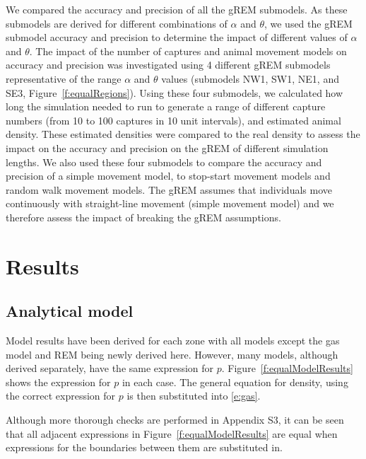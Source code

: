 \documentclass[a4paper,10pt,reqno,oneside]{amsart}
\begin{document}
We compared the accuracy and precision of all the gREM submodels. As these submodels are derived for different combinations of $\alpha$ and $\theta$, we used the gREM submodel accuracy and precision to determine the impact of different values of $\alpha$ and $\theta$. The impact of the number of captures and animal movement models on accuracy and precision was investigated using 4 different gREM submodels representative of the range $\alpha$ and $\theta$ values (submodels NW1, SW1, NE1, and SE3, Figure~\ref{f:equalRegions}). Using these four submodels, we calculated how long the simulation needed to run to generate a range of different capture numbers (from 10 to 100 captures in 10 unit intervals), and estimated animal density. These estimated densities were compared to the real density to assess the impact on the accuracy and precision on the gREM of different simulation lengths. We also used these four submodels to compare the accuracy and precision of a simple movement model, to stop-start movement models and random walk movement models. The gREM assumes that individuals move continuously with straight-line movement (simple movement model) and we therefore assess the impact of breaking the gREM assumptions. 


\section{Results}

\subsection{Analytical model}

Model results have been derived for each zone with all models except the gas model and REM being newly derived here. However, many models, although derived separately, have the same expression for $p$. Figure~\ref{f:equalModelResults} shows the expression for $p$ in each case. The general equation for density, using the correct expression for $p$ is then substituted into \ref{e:gas}.

Although more thorough checks are performed in Appendix S3, it can be seen that all adjacent expressions in Figure~\ref{f:equalModelResults} are equal when expressions for the boundaries between them are substituted in.
\end{document}
